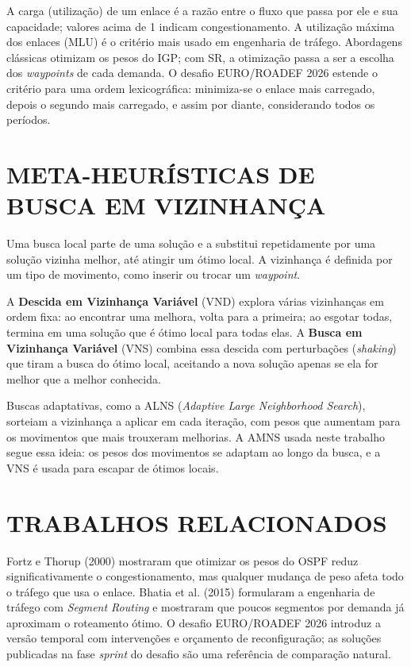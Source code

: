 A carga (utilização) de um enlace é a razão entre o fluxo que passa por ele e sua capacidade; valores acima de 1 indicam congestionamento. A utilização máxima dos enlaces (MLU) é o critério mais usado em engenharia de tráfego. Abordagens clássicas otimizam os pesos do IGP; com SR, a otimização passa a ser a escolha dos \textit{waypoints} de cada demanda. O desafio EURO/ROADEF 2026 estende o critério para uma ordem lexicográfica: minimiza-se o enlace mais carregado, depois o segundo mais carregado, e assim por diante, considerando todos os períodos.

\section{\uppercase{Meta-heurísticas de Busca em Vizinhança}}

Uma busca local parte de uma solução e a substitui repetidamente por uma solução vizinha melhor, até atingir um ótimo local. A vizinhança é definida por um tipo de movimento, como inserir ou trocar um \textit{waypoint}.

A \textbf{Descida em Vizinhança Variável} (VND) explora várias vizinhanças em ordem fixa: ao encontrar uma melhora, volta para a primeira; ao esgotar todas, termina em uma solução que é ótimo local para todas elas. A \textbf{Busca em Vizinhança Variável} (VNS) combina essa descida com perturbações (\textit{shaking}) que tiram a busca do ótimo local, aceitando a nova solução apenas se ela for melhor que a melhor conhecida.

Buscas adaptativas, como a ALNS (\textit{Adaptive Large Neighborhood Search}), sorteiam a vizinhança a aplicar em cada iteração, com pesos que aumentam para os movimentos que mais trouxeram melhorias. A AMNS usada neste trabalho segue essa ideia: os pesos dos movimentos se adaptam ao longo da busca, e a VNS é usada para escapar de ótimos locais.

\section{\uppercase{Trabalhos Relacionados}}

Fortz e Thorup (2000) mostraram que otimizar os pesos do OSPF reduz significativamente o congestionamento, mas qualquer mudança de peso afeta todo o tráfego que usa o enlace. Bhatia et al. (2015) formularam a engenharia de tráfego com \textit{Segment Routing} e mostraram que poucos segmentos por demanda já aproximam o roteamento ótimo. O desafio EURO/ROADEF 2026 introduz a versão temporal com intervenções e orçamento de reconfiguração; as soluções publicadas na fase \textit{sprint} do desafio são uma referência de comparação natural.


